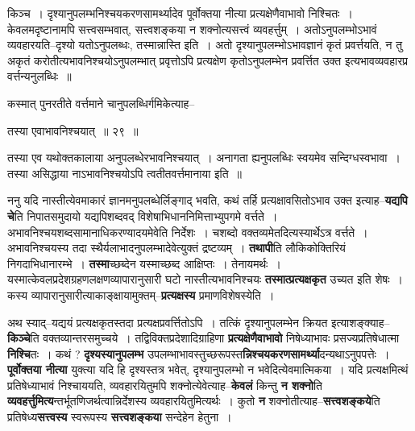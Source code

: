 \documentclass[article,12pt,a4paper]{memoir}
\begin{document}
	  \pstart किञ्च । दृश्यानुपलम्भनिश्चयकरणसामर्थ्यादेव पूर्वोक्तया नीत्या प्रत्यक्षेणैवाभावो निश्चितः । केवलमदृष्टानामपि सत्त्वसम्भवात्, सत्त्वशङ्कया न शक्नोत्यसत्त्वं व्यवहर्त्तुम् । अतोऽनुपलम्भोऽभावं व्यवहारयति--दृश्यो यतोऽनुपलब्धः, तस्मान्नास्ति इति । अतो दृश्यानुपलम्भोऽभावज्ञानं कृतं प्रवर्त्तयति, न तु अकृतं करोतीत्यभावनिश्चयोऽनुपलम्भात् प्रवृत्तोऽपि प्रत्यक्षेण कृतोऽनुपलम्भेन प्रवर्त्तित उक्त इत्यभावव्यवहारप्र वर्त्तन्यनुलब्धिः ॥
	\pend
        

	  \pstart कस्मात् पुनरतीते वर्त्तमाने चानुपलब्धिर्गमिकेत्याह--
	\pend
        
	  \bigskip
	  \begingroup
	

	  \pstart तस्या एवाभावनिश्चयात् ॥ २९ ॥
	\pend
      
	  \endgroup
	 

	  \pstart तस्या एव यथोक्तकालाया अनुपलब्धेरभावनिश्चयात् । अनागता ह्यनुपलब्धिः स्वयमेव सन्दिग्धस्वभावा । तस्या असिद्धाया नाऽभावनिश्चयोऽपि त्वतीतवर्त्तमानाया इति ॥
	\pend
      
	  \endgroup
	

	  \pstart ननु यदि नास्तीत्येवमाकारं ज्ञानमनुपलब्धेर्लिङ्गाद् भवति, कथं तर्हि प्रत्यक्षावसितोऽभाव उक्त इत्याह--\textbf{यद्यपि चे}ति निपातसमुदायो यद्यपिशब्दवद् विशेषाभिधाननिमित्ताभ्युपगमे वर्त्तते । अभावनिश्चयशब्दसामानाधिकरण्यादयमेवेति निर्देशः । चशब्दो वक्तव्यमेतदित्यस्यार्थेऽत्र वर्त्तते । अभावनिश्चयस्य तदा स्थैर्यलाभादनुपलम्भादेवेत्युक्तं द्रष्टव्यम् । \textbf{तथापी}ति लौकिकोक्तिरियं निगदाभिधानारम्भे । \textbf{तस्मा}च्छब्देन यस्माच्छब्द आक्षिप्तः । तेनायमर्थः । यस्मात्केवलप्रदेशग्रहणलक्षणव्यापारानुसारी घटो नास्तीत्यभावनिश्चयः \textbf{तस्मात्प्रत्यक्षकृत} उच्यत इति शेषः । कस्य व्यापारानुसारीत्याकाङ्क्षायामुक्तम्--\textbf{प्रत्यक्षस्य} प्रमाणविशेषस्येति ।
	\pend
      

	  \pstart अथ स्याद्--यद्ययं प्रत्यक्षकृतस्तदा प्रत्यक्षप्रवर्त्तितोऽपि । तत्किं दृश्यानुपलम्भेन क्रियत इत्याशङ्क्याह--\textbf{किञ्चे}ति वक्तव्यान्तरसमुच्चये । तद्विविक्तप्रदेशादिग्राहिणा \textbf{प्रत्यक्षेणैवाभावो} निषेध्याभावः प्रसज्यप्रतिषेधात्मा \textbf{निश्चि}तः । कथं ? \textbf{दृश्यस्यानुपलम्भ} उपलम्भाभावस्तुच्छरूपस्त\textbf{न्निश्चयकरणसामर्थ्या}दन्यथाऽनुपपत्तेः । \textbf{पूर्वोक्तया नीत्या} युक्त्या यदि हि दृश्यस्तत्र भवेत्, दृश्यानुपलम्भो न भवेदित्येवमात्मिकया । यदि प्रत्यक्षमित्थं प्रतिषेध्याभावं निश्चाययति, व्यवहारयितुमपि शक्नोत्येवेत्याह--\textbf{केवलं} किन्तु \textbf{न शक्नो}ति \textbf{व्यवहर्त्तुमित्य}न्तर्भूतणिजर्थत्वान्निर्देशस्य व्यवहारयितुमित्यर्थः । कुतो \textbf{न} शक्नोतीत्याह--\textbf{सत्त्वशङ्कये}ति प्रतिषेध्य\textbf{सत्त्वस्य} स्वरूपस्य \textbf{सत्त्वशङ्कया} सन्देहेन हेतुना ।
	\pend
      
\end{document}

